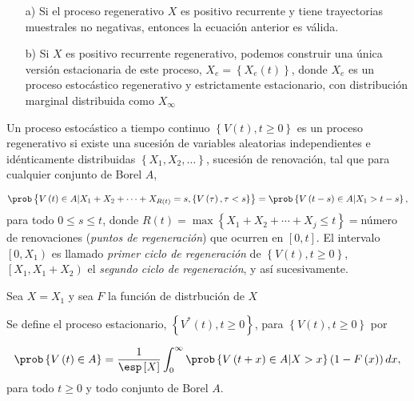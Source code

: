 \begin{Note}
\begin{itemize}
\item[a)] Si el proceso regenerativo $X$ es positivo recurrente y tiene trayectorias muestrales no negativas, entonces la ecuaci\'on anterior es v\'alida.
\item[b)] Si $X$ es positivo recurrente regenerativo, podemos construir una \'unica versi\'on estacionaria de este proceso, $X_{e}=\left\{X_{e}\left(t\right)\right\}$, donde $X_{e}$ es un proceso estoc\'astico regenerativo y estrictamente estacionario, con distribuci\'on marginal distribuida como $X_{\infty}$
\end{itemize}
\end{Note}



Un proceso estoc\'astico a tiempo continuo $\left\{V\left(t\right),t\geq0\right\}$ es un proceso regenerativo si existe una sucesi\'on de variables aleatorias independientes e id\'enticamente distribuidas $\left\{X_{1},X_{2},\ldots\right\}$, sucesi\'on de renovaci\'on, tal que para cualquier conjunto de Borel $A$, 

\begin{eqnarray*}
\prob\left\{V\left(t\right)\in A|X_{1}+X_{2}+\cdots+X_{R\left(t\right)}=s,\left\{V\left(\tau\right),\tau<s\right\}\right\}=\prob\left\{V\left(t-s\right)\in A|X_{1}>t-s\right\},
\end{eqnarray*}
para todo $0\leq s\leq t$, donde $R\left(t\right)=\max\left\{X_{1}+X_{2}+\cdots+X_{j}\leq t\right\}=$n\'umero de renovaciones ({\emph{puntos de regeneraci\'on}}) que ocurren en $\left[0,t\right]$. El intervalo $\left[0,X_{1}\right)$ es llamado {\emph{primer ciclo de regeneraci\'on}} de $\left\{V\left(t \right),t\geq0\right\}$, $\left[X_{1},X_{1}+X_{2}\right)$ el {\emph{segundo ciclo de regeneraci\'on}}, y as\'i sucesivamente.

Sea $X=X_{1}$ y sea $F$ la funci\'on de distrbuci\'on de $X$


\begin{Def}
Se define el proceso estacionario, $\left\{V^{*}\left(t\right),t\geq0\right\}$, para $\left\{V\left(t\right),t\geq0\right\}$ por

\begin{eqnarray*}
\prob\left\{V\left(t\right)\in A\right\}=\frac{1}{\esp\left[X\right]}\int_{0}^{\infty}\prob\left\{V\left(t+x\right)\in A|X>x\right\}\left(1-F\left(x\right)\right)dx,
\end{eqnarray*} 
para todo $t\geq0$ y todo conjunto de Borel $A$.
\end{Def}

